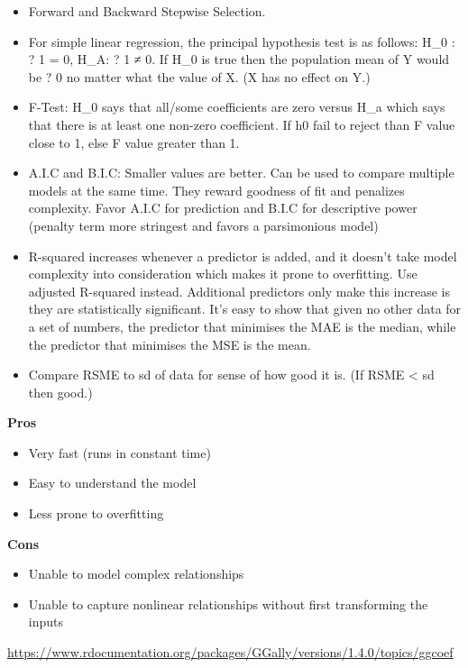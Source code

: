 \documentclass[]{book}
\begin{document}
\begin{itemize}
\item
  Forward and Backward Stepwise Selection.
\item
  For simple linear regression, the principal hypothesis test is as follows: H\_0 : ? 1 = 0, H\_A: ? 1 ≠ 0.
  If H\_0 is true then the population mean of Y would be ? 0 no matter what the value of X. (X has no effect on Y.)
\item
  F-Test: H\_0 says that all/some coefficients are zero versus H\_a which says that there is at least one non-zero coefficient. If h0 fail to reject than F value close to 1, else F value greater than 1.
\item
  A.I.C and B.I.C: Smaller values are better. Can be used to compare multiple models at the same time. They reward goodness of fit and penalizes complexity. Favor A.I.C for prediction and B.I.C for descriptive power (penalty term more stringest and favors a parsimonious model)
\item
  R-squared increases whenever a predictor is added, and it doesn't take model complexity into consideration which makes it prone to overfitting. Use adjusted R-squared instead. Additional predictors only make this increase is they are statistically significant. It's easy to show that given no other data for a set of numbers, the predictor that minimises the MAE is the median, while the predictor that minimises the MSE is the mean.
\item
  Compare RSME to sd of data for sense of how good it is. (If RSME \textless{} sd then good.)
\end{itemize}

\textbf{Pros}

\begin{itemize}
\item
  Very fast (runs in constant time)
\item
  Easy to understand the model
\item
  Less prone to overfitting
\end{itemize}

\textbf{Cons}

\begin{itemize}
\item
  Unable to model complex relationships
\item
  Unable to capture nonlinear relationships without first transforming the inputs
\end{itemize}

\url{https://www.rdocumentation.org/packages/GGally/versions/1.4.0/topics/ggcoef}
\end{document}
